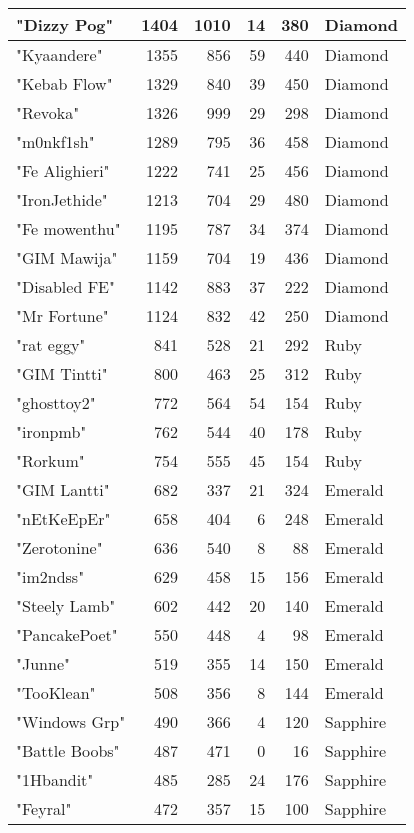 \documentclass{article}
\begin{document}
\begin{table}[htbp]
\begin{tabular}{|l|r|r|r|r|l|}
"Dizzy Pog" & 1404 & 1010 & 14 & 380 & Diamond \\ \hline
"Kyaandere" & 1355 & 856 & 59 & 440 & Diamond \\ \hline
"Kebab Flow" & 1329 & 840 & 39 & 450 & Diamond \\ \hline
"Revoka" & 1326 & 999 & 29 & 298 & Diamond \\ \hline
"m0nkf1sh" & 1289 & 795 & 36 & 458 & Diamond \\ \hline
"Fe Alighieri" & 1222 & 741 & 25 & 456 & Diamond \\ \hline
"IronJethide" & 1213 & 704 & 29 & 480 & Diamond \\ \hline
"Fe mowenthu" & 1195 & 787 & 34 & 374 & Diamond \\ \hline
"GIM Mawija" & 1159 & 704 & 19 & 436 & Diamond \\ \hline
"Disabled FE" & 1142 & 883 & 37 & 222 & Diamond \\ \hline
"Mr Fortune" & 1124 & 832 & 42 & 250 & Diamond \\ \hline
"rat eggy" & 841 & 528 & 21 & 292 & Ruby \\ \hline
"GIM Tintti" & 800 & 463 & 25 & 312 & Ruby \\ \hline
"ghosttoy2" & 772 & 564 & 54 & 154 & Ruby \\ \hline
"ironpmb" & 762 & 544 & 40 & 178 & Ruby \\ \hline
"Rorkum" & 754 & 555 & 45 & 154 & Ruby \\ \hline
"GIM Lantti" & 682 & 337 & 21 & 324 & Emerald \\ \hline
"nEtKeEpEr" & 658 & 404 & 6 & 248 & Emerald \\ \hline
"Zerotonine" & 636 & 540 & 8 & 88 & Emerald \\ \hline
"im2ndss" & 629 & 458 & 15 & 156 & Emerald \\ \hline
"Steely Lamb" & 602 & 442 & 20 & 140 & Emerald \\ \hline
"PancakePoet" & 550 & 448 & 4 & 98 & Emerald \\ \hline
"Junne" & 519 & 355 & 14 & 150 & Emerald \\ \hline
"TooKlean" & 508 & 356 & 8 & 144 & Emerald \\ \hline
"Windows Grp" & 490 & 366 & 4 & 120 & Sapphire \\ \hline
"Battle Boobs" & 487 & 471 & 0 & 16 & Sapphire \\ \hline
"1Hbandit" & 485 & 285 & 24 & 176 & Sapphire \\ \hline
"Feyral" & 472 & 357 & 15 & 100 & Sapphire \\ \hline

\end{tabular}
\end{table}
\end{document}
